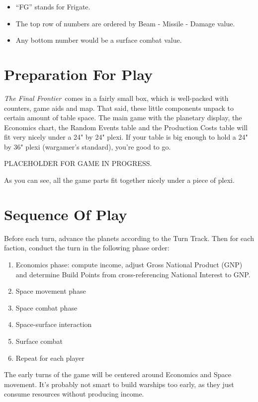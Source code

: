 \documentclass[10pt]{article}
\def\tff{{\em The Final Frontier}}
\begin{document}
\begin{multicols}{2}
\begin{itemize}
  \item ``FG'' stands for Frigate.
  \item The top row of numbers are ordered by Beam - Missile - Damage value.
  \item Any bottom number would be a surface combat value.
\end{itemize}

\section{Preparation For Play}


\tff\ comes in a fairly small box, which is well-packed with counters,
game aids and map. That said, these little components unpack to certain
amount of table space. The main game with the planetary display, the
Economics chart, the Random Events table and the Production Costs
table will fit very nicely under a 24" by 24" plexi. If your table is
big enough to hold a 24" by 36" plexi (wargamer's standard), you're good
to go.

\begin{center}
  PLACEHOLDER FOR GAME IN PROGRESS.
\end{center}

As you can see, all the game parts fit together nicely under a piece of plexi.

\section{Sequence Of Play}

Before each turn, advance the planets according to the Turn Track. Then for
each faction, conduct the turn in the following phase order:

\begin{enumerate}
  \item Economics phase: compute income, adjust Gross National Product (GNP) and
    determine Build Points from cross-referencing National Interest to GNP.
  \item Space movement phase
  \item Space combat phase
  \item Space-surface interaction
  \item Surface combat
  \item Repeat for each player
\end{enumerate}

The early turns of the game will be centered around Economics and Space movement.
It's probably not smart to build warships too early, as they just consume resources
without producing income.



\end{multicols}
\end{document}
